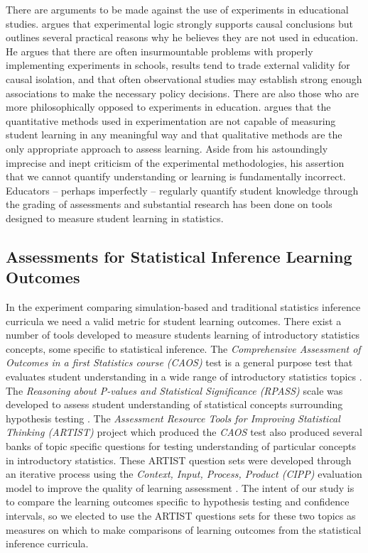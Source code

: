 \documentclass[11pt]{isuthesis}
\begin{document}
There are arguments to be made against the use of experiments in educational studies. \citet{Cook2002} argues that experimental logic strongly supports causal conclusions but outlines several practical reasons why he believes they are not used in education.  He argues that there are often insurmountable problems with properly implementing experiments in schools, results tend to trade external validity for causal isolation, and that often observational studies may establish strong enough associations to make the necessary policy decisions. There are also those who are more philosophically opposed to experiments in education. \citet{Howe2004} argues that the quantitative methods used in experimentation are not capable of measuring student learning in any meaningful way and that qualitative methods are the only appropriate approach to assess learning. Aside from his astoundingly imprecise and inept criticism of the experimental methodologies, his assertion that we cannot quantify understanding or learning is fundamentally incorrect. Educators -- perhaps imperfectly -- regularly quantify student knowledge through the grading of assessments and substantial research has been done on tools designed to measure student learning in statistics.

\subsection{Assessments for Statistical Inference Learning Outcomes} 

In the experiment comparing simulation-based and traditional statistics inference curricula we need a valid metric for student learning outcomes. There exist a number of tools developed to measure students learning of introductory statistics concepts, some specific to statistical inference. The \textit{Comprehensive Assessment of Outcomes in a first Statistics course (CAOS)} test is a general purpose test that evaluates student understanding in a wide range of introductory statistics topics \citep{DelMas2007}. The \textit{Reasoning about P-values and Statistical Significance (RPASS)} scale was developed to assess student understanding of statistical concepts surrounding hypothesis testing \citep{LaneGetaz2013}. The \textit{Assessment Resource Tools for Improving Statistical Thinking (ARTIST)} project which produced the \textit{CAOS} test also produced several banks of topic specific questions for testing understanding of particular concepts in introductory statistics. These ARTIST question sets were developed through an iterative process using the \textit{Context, Input, Process, Product (CIPP)} evaluation model to improve the quality of learning assessment \citep{Ooms2008}. The intent of our study is to compare the learning outcomes specific to hypothesis testing and confidence intervals, so we elected to use the ARTIST questions sets for these two topics as measures on which to make comparisons of learning outcomes from the statistical inference curricula. 
\end{document}
